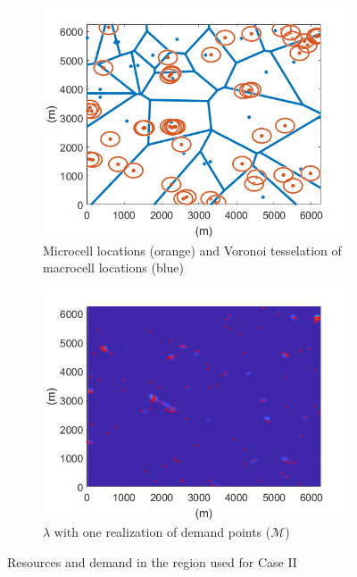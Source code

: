 \documentclass[12pt,dvipsnames]{report}
\begin{document}
\begin{figure}[htp]
	\centering
	\begin{subfigure}{.49\textwidth}
		\centering
		\includegraphics[width=1\linewidth]{Figures/CaseII_BSLocationsVoronoiCircles}
		\caption{\small Microcell locations (orange) and Voronoi tesselation of macrocell locations (blue)}
		\label{fig:CaseII_BSLocVor}
	\end{subfigure} \hfill
	\begin{subfigure}{.49\textwidth}
		\centering
		\includegraphics[width=1\linewidth]{Figures/CaseII_SSLTnsPPP_demandpointreal}
		\caption{\small $\lambda$ with one realization of demand points ($\mathcal{M}$)}
		\label{fig:CaseII_SSLTDPReal}
	\end{subfigure}
	\caption{Resources and demand in the region used for Case II}
	\label{fig:CaseII_NetworkArea}
\end{figure}
\end{document}
